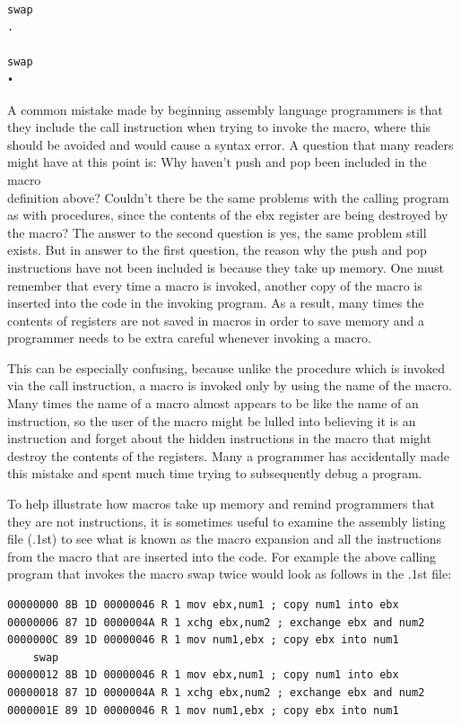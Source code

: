 \documentclass[10pt]{article}
\begin{document}
\begin{verbatim}
 
swap
.
  
swap
•
\end{verbatim}

A common mistake made by beginning assembly language programmers is that they include the call instruction when trying to invoke the macro, where this should be avoided and would cause a syntax error. A question that many readers might have at this point is: Why haven't push and pop been included in the macro\\
definition above? Couldn't there be the same problems with the calling program as with procedures, since the contents of the ebx register are being destroyed by the macro? The answer to the second question is yes, the same problem still exists. But in answer to the first question, the reason why the push and pop instructions have not been included is because they take up memory. One must remember that every time a macro is invoked, another copy of the macro is inserted into the code in the invoking program. As a result, many times the contents of registers are not saved in macros in order to save memory and a programmer needs to be extra careful whenever invoking a macro.

This can be especially confusing, because unlike the procedure which is invoked via the call instruction, a macro is invoked only by using the name of the macro. Many times the name of a macro almost appears to be like the name of an instruction, so the user of the macro might be lulled into believing it is an instruction and forget about the hidden instructions in the macro that might destroy the contents of the registers. Many a programmer has accidentally made this mistake and spent much time trying to subsequently debug a program.

To help illustrate how macros take up memory and remind programmers that they are not instructions, it is sometimes useful to examine the assembly listing file (.1st) to see what is known as the macro expansion and all the instructions from the macro that are inserted into the code. For example the above calling program that invokes the macro swap twice would look as follows in the .1st file:

\begin{verbatim}
00000000 8B 1D 00000046 R 1 mov ebx,num1 ; copy num1 into ebx
00000006 87 1D 0000004A R 1 xchg ebx,num2 ; exchange ebx and num2
0000000C 89 1D 00000046 R 1 mov num1,ebx ; copy ebx into num1
    swap
00000012 8B 1D 00000046 R 1 mov ebx,num1 ; copy num1 into ebx
00000018 87 1D 0000004A R 1 xchg ebx,num2 ; exchange ebx and num2
0000001E 89 1D 00000046 R 1 mov num1,ebx ; copy ebx into num1
\end{verbatim}
\end{document}
